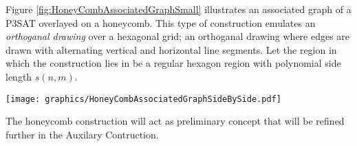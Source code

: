 Figure \ref{fig:HoneyCombAssociatedGraphSmall} illustrates an associated graph of a P3SAT overlayed on a honeycomb.
This type of construction emulates an \textit{orthoganal drawing} over a hexagonal grid; an orthoganal drawing where edges are drawn with alternating vertical and horizontal line segments.
Let the region in which the construction lies in be a regular hexagon region with polynomial side length $s(n,m)$. 

\begin{minipage}{\linewidth}
\begin{center}
\texttt{[image: graphics/HoneyCombAssociatedGraphSideBySide.pdf]}
\label{fig:HoneyCombAssociatedGraphSmall}
\end{center}
\end{minipage}

The honeycomb construction will act as preliminary concept that will be refined further in the Auxilary Contruction.
